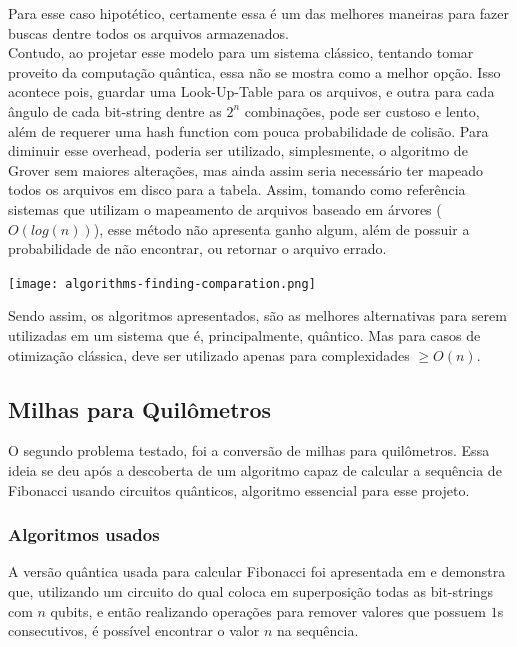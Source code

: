 \documentclass{article}
\makeatletter
\renewcommand\subsubsubsection{\@startsection{paragraph}{4}{\z@}{-2.5ex\@plus -1ex \@minus -.25ex}{1.25ex \@plus .25ex}{\normalfont\normalsize\bfseries}}
\makeatother
\begin{document}
Para esse caso hipotético, certamente essa é um das melhores maneiras para fazer buscas dentre todos os arquivos armazenados.\\
Contudo, ao projetar esse modelo para um sistema clássico, tentando tomar proveito da computação quântica, essa não se mostra como a melhor opção. Isso acontece pois, guardar uma Look-Up-Table para os arquivos, e outra para cada ângulo de cada bit-string dentre as $2^{n}$ combinações, pode ser custoso e lento, além de requerer uma hash function com pouca probabilidade de colisão. Para diminuir esse overhead, poderia ser utilizado, simplesmente, o algoritmo de Grover sem maiores alterações, mas ainda assim seria necessário ter mapeado todos os arquivos em disco para a tabela. Assim, tomando como referência sistemas que utilizam o mapeamento de arquivos baseado em árvores ($O(log(n))$), esse método não apresenta ganho algum, além de possuir a probabilidade de não encontrar, ou retornar o arquivo errado.

\begin{center}
	\texttt{[image: algorithms-finding-comparation.png]}
	\label{fig:file-explorer-comparation-O}
\end{center}

Sendo assim, os algoritmos apresentados, são as melhores alternativas para serem utilizadas em um sistema que é, principalmente, quântico. Mas para casos de otimização clássica, deve ser utilizado apenas para complexidades $\ge O(n)$.


\subsection{Milhas para Quilômetros} \label{conversion}
O segundo problema testado, foi a conversão de milhas para quilômetros. Essa ideia se deu após a descoberta de um algoritmo capaz de calcular a sequência de Fibonacci usando circuitos quânticos, algoritmo essencial para esse projeto.

\subsubsection{Algoritmos usados}

\subsubsubsection{Algoritmo Quântico de Fibonacci}
A versão quântica usada para calcular Fibonacci foi apresentada em \cite{gilliam2020canonical} e  demonstra que, utilizando um circuito do qual coloca em superposição todas as bit-strings com $n$ qubits, e então realizando operações para remover valores que possuem $1$s consecutivos, é possível encontrar o valor $n$ na sequência.
\end{document}
